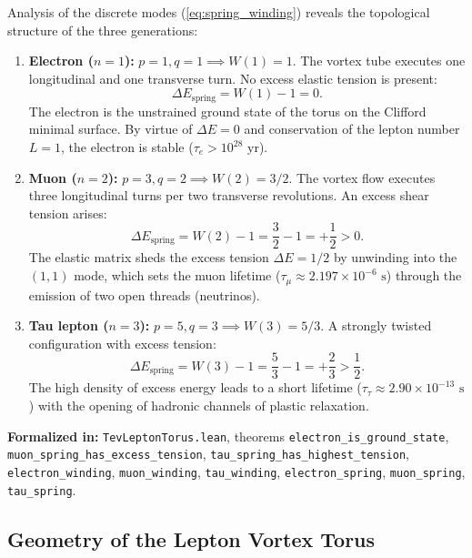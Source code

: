 \documentclass[11pt,a4paper]{article}
\theoremstyle{definition}
\theoremstyle{remark}
\begin{document}
Analysis of the discrete modes (\ref{eq:spring_winding}) reveals the topological structure of the three generations:
\begin{enumerate}
\item \textbf{Electron ($n = 1$):} $p=1, q=1 \implies W(1) = 1$. The vortex tube executes one longitudinal and one transverse turn. No excess elastic tension is present:
\begin{equation}
	\Delta E_{\mathrm{spring}} = W(1) - 1 = 0.
	\label{eq:electron_tension_zero}
\end{equation}
The electron is the unstrained ground state of the torus on the Clifford minimal surface. By virtue of $\Delta E = 0$ and conservation of the lepton number $L=1$, the electron is stable ($\tau_e > 10^{28}\text{ yr}$).

\item \textbf{Muon ($n = 2$):} $p=3, q=2 \implies W(2) = 3/2$. The vortex flow executes three longitudinal turns per two transverse revolutions. An excess shear tension arises:
\begin{equation}
	\Delta E_{\mathrm{spring}} = W(2) - 1 = \frac{3}{2} - 1 = +\frac{1}{2} > 0.
	\label{eq:muon_excess_tension}
\end{equation}
The elastic matrix sheds the excess tension $\Delta E = 1/2$ by unwinding into the $(1,1)$ mode, which sets the muon lifetime ($\tau_\mu \approx 2.197 \times 10^{-6}\text{ s}$) through the emission of two open threads (neutrinos).

\item \textbf{Tau lepton ($n = 3$):} $p=5, q=3 \implies W(3) = 5/3$. A strongly twisted configuration with excess tension:
\begin{equation}
	\Delta E_{\mathrm{spring}} = W(3) - 1 = \frac{5}{3} - 1 = +\frac{2}{3} > \frac{1}{2}.
	\label{eq:tau_excess_tension}
\end{equation}
The high density of excess energy leads to a short lifetime ($\tau_\tau \approx 2.90 \times 10^{-13}\text{ s}$) with the opening of hadronic channels of plastic relaxation.
\end{enumerate}

\noindent\small\textbf{Formalized in:} \texttt{TevLeptonTorus.lean}, theorems \texttt{electron_is_ground_state}, \texttt{muon_spring_has_excess_tension}, \texttt{tau_spring_has_highest_tension}, \texttt{electron\_winding}, \texttt{muon\_winding}, \texttt{tau\_winding},
\texttt{electron_spring}, \texttt{muon_spring}, \texttt{tau_spring}.

\subsection{Geometry of the Lepton Vortex Torus}
	
\end{document}
